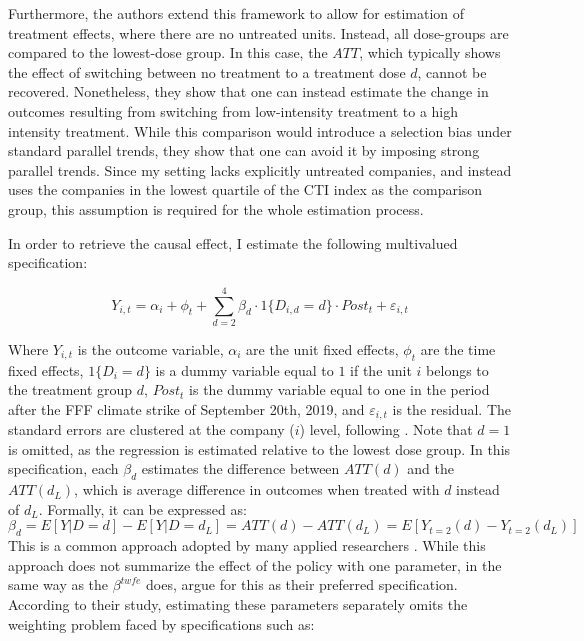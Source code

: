 \documentclass[12pt]{article}
\begin{document}
Furthermore, the authors extend this framework to allow for estimation of treatment effects, where there are no untreated units. Instead, all dose-groups are compared to the lowest-dose group. In this case, the $ATT$, which typically shows the effect of switching between no treatment to a treatment dose $d$, cannot be recovered. Nonetheless, they show that one can instead estimate the change in outcomes resulting from switching from low-intensity treatment to a high intensity treatment. While this comparison would introduce a selection bias under standard parallel trends, they show that one can avoid it by imposing strong parallel trends. Since my setting lacks explicitly untreated companies, and instead uses the companies in the lowest quartile of the CTI index as the comparison group, this assumption is required for the whole estimation process.


In order to retrieve the causal effect, I estimate the following multivalued specification:

\begin{equation}
    Y_{i,t} = \alpha_i + \phi_t + \sum_{d=2}^{4} \beta_d \cdot 1\{D_{i,d}=d\}\cdot Post_t + \varepsilon_{i,t}
\end{equation}

Where $Y_{i,t}$ is the outcome variable, $\alpha_i$ are the unit fixed effects, $\phi_t$ are the time fixed effects, $1\{D_{i}=d\}$ is a dummy variable equal to $1$ if the unit $i$ belongs to the treatment group $d$, $Post_t$ is the dummy variable equal to one in the period after the FFF climate strike of September 20th, 2019, and $\varepsilon_{i,t}$ is the residual. The standard errors are clustered at the company ($i$) level, following \textcite{abadieWhenShouldYou2022}. Note that $d=1$ is omitted, as the regression is estimated relative to the lowest dose group. In this specification, each $\beta_d$ estimates the difference between $ATT(d)$ and the $ATT(d_L)$, which is average difference in outcomes when treated with $d$ instead of $d_L$. Formally, it can be expressed as: 
\begin{equation}
    \beta_d = E[Y|D = d] - E[Y |D = d_L] = ATT(d) - ATT(d_L) = E[Y_{t=2}(d) - Y_{t=2}(d_L)]
\end{equation}
This is a common approach adopted by many applied researchers \parencite{acemoglu_finkelstein_medicare,deschenes_greenstone_clim_change}. While this approach does not summarize the effect of the policy with one parameter, in the same way as the $\beta^{twfe}$ does, \citeauthor{callawayDifferenceinDifferencesContinuousTreatment2025} argue for this as their preferred specification. According to their study, estimating these parameters separately omits the weighting problem faced by specifications such as:
\end{document}
